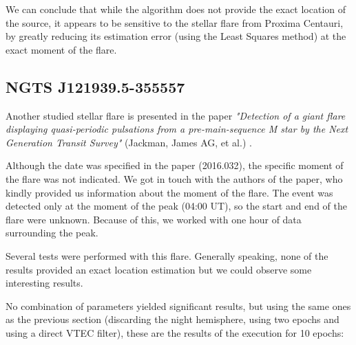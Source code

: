 We can conclude that while the algorithm does not provide the exact location of the source, it appears to be sensitive to the stellar flare from Proxima Centauri, by greatly reducing its estimation error (using the Least Squares method) at the exact moment of the flare.
\clearpage

\subsection{NGTS J121939.5-355557}

Another studied stellar flare is presented in the paper \textit{"Detection of a giant flare displaying quasi-periodic pulsations from a pre-main-sequence M star by the Next Generation Transit Survey"} (Jackman, James AG, et al.) \cite{jackman2018detection}. 

Although the date was specified in the paper (2016.032), the specific moment of the flare was not indicated. We got in touch with the authors of the paper, who kindly provided us information about the moment of the flare. The event was detected only at the moment of the peak (04:00 UT), so the start and end of the flare were unknown. Because of this, we worked with one hour of data surrounding the peak.

Several tests were performed with this flare. Generally speaking, none of the results provided an exact location estimation but we could observe some interesting results.

No combination of parameters yielded significant results, but using the same ones as the previous section (discarding the night hemisphere, using two epochs and using a direct VTEC filter), these are the results of the execution for 10 epochs:

